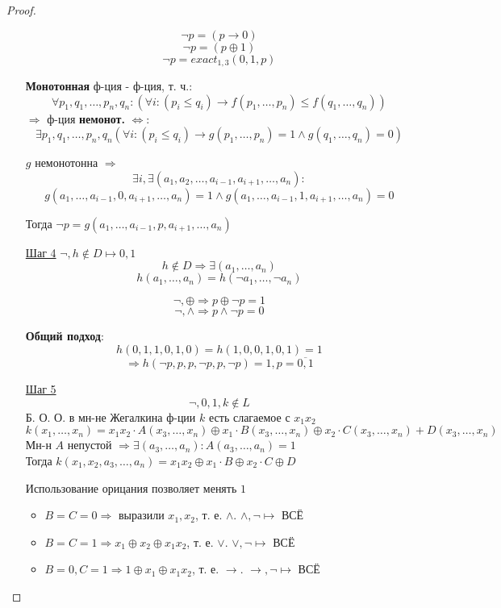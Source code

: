\begin{proof}
\begin{itemize}
\begin{example}
      \[
        \neg p = (p \rightarrow 0)
      \]
      \[
        \neg p = (p \oplus 1)
      \]
      \[
        \neg p = exact_{1, 3}(0, 1, p)
      \]
    \end{example}
\begin{definition}
    \textbf{Монотонная} ф-ция - ф-ция, т. ч.:
    \[
    \forall p_1, q_1, \ldots, p_n, q_n \colon (\forall i \colon (p_i \leq q_i) \rightarrow f(p_1, \ldots, p_n) \leq f(q_1, \ldots, q_n))
    \]
    $\Rightarrow$ ф-ция \textbf{немонот.} $\iff$:
    \[
    \exists p_1, q_1, \ldots, p_n, q_n (\forall i \colon (p_i \leq q_i) \rightarrow g(p_1, \ldots, p_n) = 1 \land g(q_1, \ldots, q_n) = 0)
    \]
\begin{lemma}
$g$ немонотонна $ \Rightarrow$
\[
  \exists i, \exists (a_1, a_2, \ldots, a_{i - 1}, a_{i + 1}, \ldots, a_n) \colon 
\]
\[
g(a_1, \ldots, a_{i - 1}, 0, a_{i + 1}, \ldots, a_n) = 1 \land g(a_1, \ldots, a_{i - 1}, 1, a_{i + 1}, \ldots, a_n) = 0
\]
\end{lemma}
\end{definition}
    Тогда $\neg p = g(a_1, \ldots, a_{i - 1}, p, a_{i + 1}, \ldots, a_n)$

  \item [\underline{Шаг 4}] $\neg, h \not\in D \mapsto 0, 1$
    \[
    h \not\in D \Rightarrow \exists (a_1, \ldots, a_n)
    \]
    \[
    h(a_1, \ldots, a_n) = h(\neg a_1, \ldots, \neg a_n)
    \]
    \begin{example}
    \[
    \neg, \oplus \Rightarrow p \oplus \neg p = 1
    \]
    \[
    \neg, \land \Rightarrow p \land \neg p = 0
    \]
    \end{example}
    \textbf{Общий подход}:
    \[
    h(0, 1, 1, 0, 1, 0) = h(1, 0, 0, 1, 0, 1) = 1
    \]
    \[
    \Rightarrow h(\neg p, p, p, \neg p, p, \neg p) = 1, p = \overline{0, 1}
    \]
  \item [\underline{Шаг 5}]
    \[
    \neg, 0, 1, k \not\in L
    \]
    Б. О. О. в мн-не Жегалкина ф-ции $k$ есть слагаемое с $x_1x_2$
    \[
    k(x_1, \ldots, x_n) = x_1x_2 \cdot A(x_3, \ldots, x_n) \oplus x_1 \cdot B(x_3, \ldots, x_n) \oplus x_2 \cdot C(x_3, \ldots, x_n) + D(x_3, \ldots, x_n)
    \]
    Мн-н $A$ непустой $\Rightarrow \exists (a_3, \ldots, a_n) \colon A(a_3, \ldots, a_n) = 1$ \\
    Тогда $k(x_1, x_2, a_3, \ldots, a_n) = x_1x_2 \oplus x_1 \cdot B \oplus x_2 \cdot C \oplus D$

    Использование орицания позволяет менять $1$
    \begin{itemize}
      \item $B = C = 0 \Rightarrow $ выразили $x_1, x_2$, т. е. $\land$. $\land, \neg \mapsto $ ВСЁ
      \item $B = C = 1 \Rightarrow x_1 \oplus x_2 \oplus x_1x_2$, т. е. $\lor$. $\lor, \neg \mapsto$ ВСЁ
      \item $B = 0, C = 1 \Rightarrow 1 \oplus x_1 \oplus x_1x_2$, т. е. $\rightarrow$. $\rightarrow, \neg \mapsto$ ВСЁ
    \end{itemize}
\end{itemize}
\end{proof}

